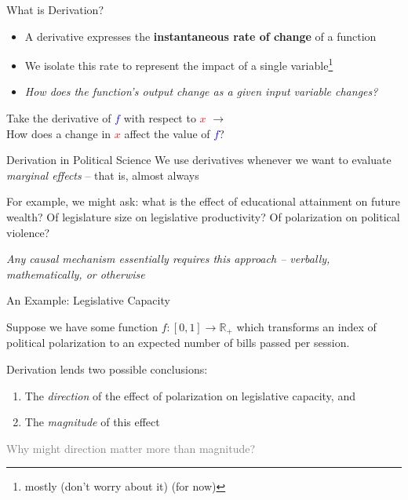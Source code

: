 \documentclass[10pt]{beamer}
\begin{document}
\begin{frame}{What is Derivation?}
    \begin{itemize}
        \item A derivative expresses the \textbf{instantaneous rate of change} of a function
        \item We isolate this rate to represent the impact of a single variable\footnote{mostly (don't worry about it) (for now)}
        \item \textit{How does the function's output change as a given input variable changes?}
    \end{itemize}

    \vspace{1cm}

    Take the derivative of \textcolor{blue}{$f$} with respect to \textcolor{red}{$x$} $\rightarrow$ \\
    \vspace{.3cm}
    How does a change in \textcolor{red}{$x$} affect the value of \textcolor{blue}{$f$}?
\end{frame}

\begin{frame}{Derivation in Political Science}
We use derivatives whenever we want to evaluate \emph{marginal effects} -- that is, almost always

For example, we might ask: what is the effect of educational attainment on future wealth? Of legislature size on legislative productivity? Of polarization on political violence?

\emph{Any causal mechanism essentially requires this approach -- verbally, mathematically, or otherwise}
\end{frame}

\begin{frame}{An Example: Legislative Capacity}

Suppose we have some function $f: [0,1] \to \mathbb{R}_+$ which transforms an index of political polarization to an expected number of bills passed per session. 

Derivation lends two possible conclusions:

\begin{enumerate}
    \item The \emph{direction} of the effect of polarization on legislative capacity, and
    \item The \emph{magnitude} of this effect
\end{enumerate}

\textcolor{gray}{Why might direction matter more than magnitude?}
    
\end{frame}
\end{document}
